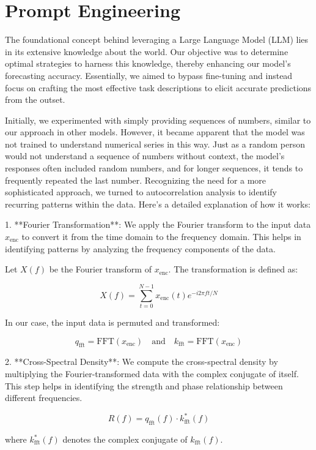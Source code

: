 \section{Prompt Engineering}

The foundational concept behind leveraging a Large Language Model (LLM) lies in its extensive knowledge about the world. Our objective was to determine optimal strategies to harness this knowledge, thereby enhancing our model's forecasting accuracy. Essentially, we aimed to bypass fine-tuning and instead focus on crafting the most effective task descriptions to elicit accurate predictions from the outset.

Initially, we experimented with simply providing sequences of numbers, similar to our approach in other models. However, it became apparent that the model was not trained to understand numerical series in this way. Just as a random person would not understand a sequence of numbers without context, the model's responses often included random numbers, and for longer sequences, it tends to frequently repeated the last number.
Recognizing the need for a more sophisticated approach, we turned to autocorrelation analysis to identify recurring patterns within the data. Here’s a detailed explanation of how it works:

1. **Fourier Transformation**: We apply the Fourier transform to the input data \( x_{\text{enc}} \) to convert it from the time domain to the frequency domain. This helps in identifying patterns by analyzing the frequency components of the data.

Let \( X(f) \) be the Fourier transform of \( x_{\text{enc}} \). The transformation is defined as:

\[
	X(f) = \sum_{t=0}^{N-1} x_{\text{enc}}(t) e^{-i 2 \pi f t / N}
\]

In our case, the input data is permuted and transformed:

\[
	q_{\text{fft}} = \text{FFT}(x_{\text{enc}}) \quad \text{and} \quad k_{\text{fft}} = \text{FFT}(x_{\text{enc}})
\]

2. **Cross-Spectral Density**: We compute the cross-spectral density by multiplying the Fourier-transformed data with the complex conjugate of itself. This step helps in identifying the strength and phase relationship between different frequencies.

\[
	R(f) = q_{\text{fft}}(f) \cdot k_{\text{fft}}^*(f)
\]

where \( k_{\text{fft}}^*(f) \) denotes the complex conjugate of \( k_{\text{fft}}(f) \).

